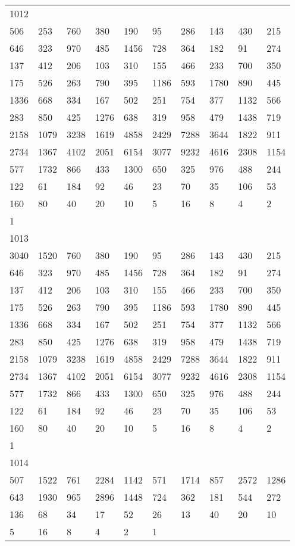 \begin{longtable}{*{10}{l}}
1012&&&&&&&&&\\
506& 253& 760& 380& 190& 95& 286& 143& 430& 215\\
646& 323& 970& 485& 1456& 728& 364& 182& 91& 274\\
137& 412& 206& 103& 310& 155& 466& 233& 700& 350\\
175& 526& 263& 790& 395& 1186& 593& 1780& 890& 445\\
1336& 668& 334& 167& 502& 251& 754& 377& 1132& 566\\
283& 850& 425& 1276& 638& 319& 958& 479& 1438& 719\\
2158& 1079& 3238& 1619& 4858& 2429& 7288& 3644& 1822& 911\\
2734& 1367& 4102& 2051& 6154& 3077& 9232& 4616& 2308& 1154\\
577& 1732& 866& 433& 1300& 650& 325& 976& 488& 244\\
122& 61& 184& 92& 46& 23& 70& 35& 106& 53\\
160& 80& 40& 20& 10& 5& 16& 8& 4& 2\\
1& \\

1013&&&&&&&&&\\
3040& 1520& 760& 380& 190& 95& 286& 143& 430& 215\\
646& 323& 970& 485& 1456& 728& 364& 182& 91& 274\\
137& 412& 206& 103& 310& 155& 466& 233& 700& 350\\
175& 526& 263& 790& 395& 1186& 593& 1780& 890& 445\\
1336& 668& 334& 167& 502& 251& 754& 377& 1132& 566\\
283& 850& 425& 1276& 638& 319& 958& 479& 1438& 719\\
2158& 1079& 3238& 1619& 4858& 2429& 7288& 3644& 1822& 911\\
2734& 1367& 4102& 2051& 6154& 3077& 9232& 4616& 2308& 1154\\
577& 1732& 866& 433& 1300& 650& 325& 976& 488& 244\\
122& 61& 184& 92& 46& 23& 70& 35& 106& 53\\
160& 80& 40& 20& 10& 5& 16& 8& 4& 2\\
1& \\

1014&&&&&&&&&\\
507& 1522& 761& 2284& 1142& 571& 1714& 857& 2572& 1286\\
643& 1930& 965& 2896& 1448& 724& 362& 181& 544& 272\\
136& 68& 34& 17& 52& 26& 13& 40& 20& 10\\
5& 16& 8& 4& 2& 1& \\


\end{longtable}
